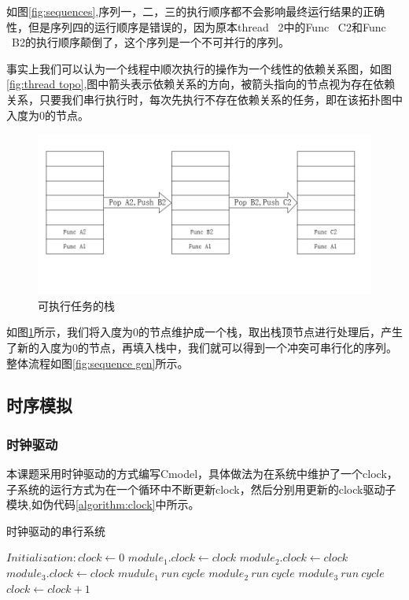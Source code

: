 如图\ref{fig:sequences},序列一，二，三的执行顺序都不会影响最终运行结果的正确性，但是序列四的运行顺序是错误的，因为原本thread \ 2中的Func \ C2和Func \ B2的执行顺序颠倒了，这个序列是一个不可并行的序列。

事实上我们可以认为一个线程中顺次执行的操作为一个线性的依赖关系图，如图\ref{fig:thread topo},图中箭头表示依赖关系的方向，被箭头指向的节点视为存在依赖关系，只要我们串行执行时，每次先执行不存在依赖关系的任务，即在该拓扑图中入度为0的节点。

\begin{figure}[hb]
    \centering
    \includegraphics[width=.7\textwidth]{figure/stack.png}
    \caption{可执行任务的栈}
    \label{fig:in degree = 0}
\end{figure}

如图\ref{fig:in degree = 0}所示，我们将入度为0的节点维护成一个栈，取出栈顶节点进行处理后，产生了新的入度为0的节点，再填入栈中，我们就可以得到一个冲突可串行化的序列。整体流程如图\ref{fig:sequence gen}所示。



\subsection{时序模拟}

\subsubsection{时钟驱动}
本课题采用时钟驱动的方式编写Cmodel，具体做法为在系统中维护了一个clock，子系统的运行方式为在一个循环中不断更新clock，然后分别用更新的clock驱动子模块,如伪代码\ref{algorithm:clock}中所示。

\begin{algorithm} 
	\caption{时钟驱动的串行系统} 
	\label{algorithm:clock} 
	\begin{algorithmic}
        \STATE $Initialization:clock \gets 0$
            \STATE $module_1.clock \gets clock$
            \STATE $module_2.clock \gets clock$
            \STATE $module_3.clock \gets clock$
            \STATE $mudule_1 \ run  \ cycle$
            \STATE $module_2 \ run \ cycle$
            \STATE $module_3 \ run \  cycle$
            \STATE $clock \gets clock +1$
        \ENDWHILE
	\end{algorithmic} 
\end{algorithm}

